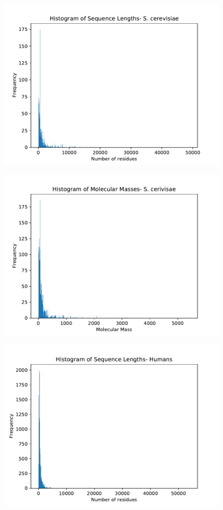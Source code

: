 \documentclass[a4paper]{article}
\begin{document}
\begin{figure}
    \includegraphics{scerevisiae_length.pdf}
\centering 
\end{figure} 
\begin{figure}
    \includegraphics{scerevisiae_mass.pdf}
\centering 
\end{figure}
\begin{figure}
    \includegraphics{human_length.pdf}
\centering 
\end{figure} 
\end{document}
